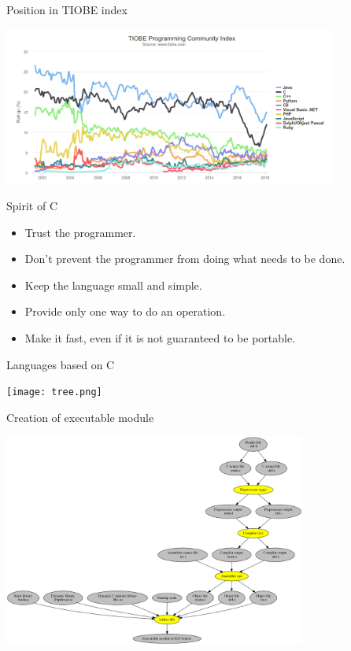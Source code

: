 \begin{frame}{Position in TIOBE index}
    \begin{center}
        \includegraphics[width=11cm]{tiobe_4.png}
    \end{center}
\end{frame}
\begin{frame}{Spirit of C}
    \begin{itemize}
        \item Trust the programmer.
        \pause \item Don’t prevent the programmer from doing what needs to be done.
        \pause \item Keep the language small and simple.
        \pause \item Provide only one way to do an operation.
        \pause \item Make it fast, even if it is not guaranteed to be portable.
    \end{itemize}
\end{frame}
\begin{frame}{Languages based on C}
    \begin{center}
        \texttt{[image: tree.png]}
    \end{center}
\end{frame}
\begin{frame}{Creation of executable module}
    \begin{center}
        \includegraphics[height=7cm]{01_flow.png}
    \end{center}
\end{frame}
